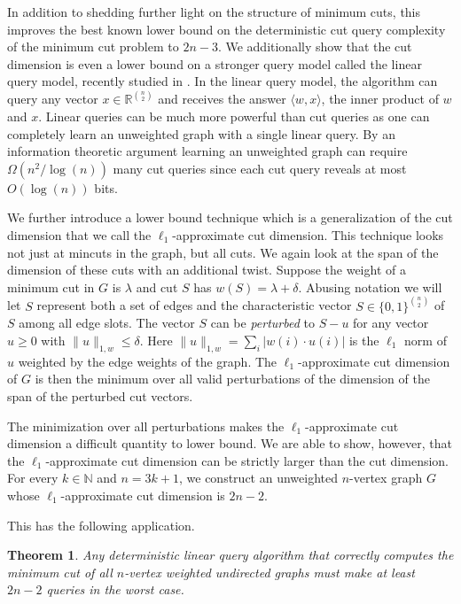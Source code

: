 \documentclass[10pt,a4paper]{article}
\newcommand{\N}{\mathbb{N}}
\newcommand{\R}{\mathbb{R}}
\newcommand{\braket}[2]{\langle#1, #2\rangle}
\newcommand{\1}{\mathbf{1}}
\newtheorem{theorem}{Theorem}
\theoremstyle{definition}
\begin{document}
In addition to shedding further light on the structure of minimum cuts, this improves the best known lower bound on the deterministic cut query complexity of
the minimum cut problem to $2n-3$.  We additionally show that the cut dimension is even a lower bound on a stronger query model called the linear query model, recently
studied in \cite{ACK20}.  In the linear query model, the algorithm can query any vector $x \in \R^{\binom{n}{2}}$ and receives the answer $\braket{w}{x}$, the
inner product of $w$ and $x$.  Linear queries can be much more powerful than cut queries as one can completely learn an unweighted graph with a single linear query.
By an information theoretic argument learning an unweighted graph can require $\Omega(n^2/\log(n))$ many cut queries since each cut query reveals at most
$O(\log (n))$ bits.

We further introduce a lower bound technique which is a generalization of the cut dimension that we call the $\ell_1$-approximate cut dimension.  This technique
looks not just at mincuts in the graph, but all cuts.  We again look at the span of the dimension of these cuts with
an additional twist.  Suppose the weight of a minimum cut in $G$ is $\lambda$ and cut $S$ has $w(S) = \lambda + \delta$.  Abusing notation we will let $S$
represent both a set of edges and the characteristic vector $S \in \{0,1\}^{\binom{n}{2}}$ of $S$ among all edge slots.
The vector $S$ can be \emph{perturbed} to $S - u$ for
any vector $u \ge 0$ with $\|u\|_{1,w} \le \delta$.  Here $\| u \|_{1,w} = \sum_i |w(i) \cdot u(i)|$ is the $\ell_1$ norm of $u$ weighted by the edge weights of
the graph.  The $\ell_1$-approximate cut dimension of $G$ is then the minimum over all valid perturbations of the dimension of the span of the perturbed cut vectors.


The minimization over all perturbations makes the $\ell_1$-approximate cut dimension a difficult quantity to lower bound.  We are able to show, however, that the $\ell_1$-approximate cut
dimension can be strictly larger than the cut dimension.  For every $k \in \N$ and $n = 3k+1$, we construct an unweighted $n$-vertex graph $G$ whose $\ell_1$-approximate cut dimension is $2n-2$.

This has the following application.
\begin{theorem}
\label{thm:2n-2}
Any deterministic linear query algorithm that correctly computes the minimum cut of all $n$-vertex weighted undirected graphs must make
at least $2n-2$ queries in the worst case.
\end{theorem}
\end{document}
